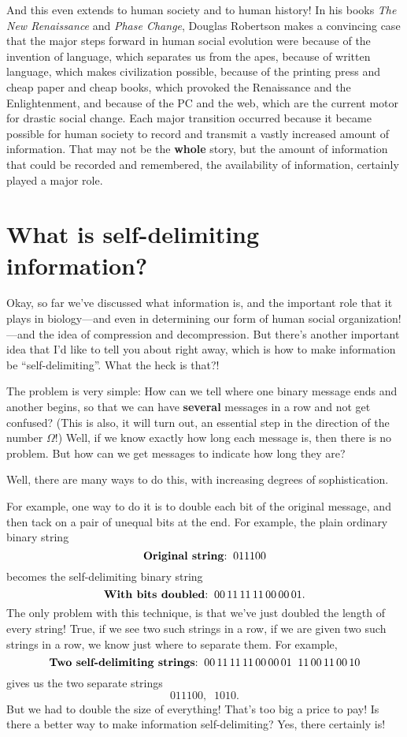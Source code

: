 \documentclass[12pt]{book}
\begin{document}
And this even extends to human society and to human history! 
In his books \emph{The New Renaissance} and \emph{Phase Change},
Douglas Robertson makes a convincing case that the major steps forward in human social evolution
were because of the invention of language, which separates us from the apes, 
because of written language, which makes
civilization possible, because of the printing press and cheap paper and cheap books, 
which provoked the Renaissance and
the Enlightenment, and because of the PC and the web, 
which are the current motor for drastic social change.
Each major transition occurred because it became possible for human society 
to record and transmit a vastly increased amount of information.
That may not be the \textbf{whole} story, but the amount of information that could be recorded and
remembered, the availability of information, certainly played a major role.

\section*{What is self-delimiting information?}

Okay, so far we've discussed what information is, and the important role that it plays in 
biology---and even in determining our form of human social organization!---and 
the idea of compression and decompression.  But there's another important idea that
I'd like to tell you about right away, which is how to make information be ``self-delimiting''.
What the heck is that?!
 
The problem is very simple: How can we tell where one binary message ends and another begins, 
so that we can have \textbf{several} messages in a row and not get confused?  
(This is also, it will turn out, an essential step
in the direction of the number $\Omega$!)
Well, if we know exactly how long each message is, then there is no problem.  But how
can we get messages to indicate how long they are?  
 
Well, there are many ways to do this, with increasing degrees of sophistication.
 
For example,
one way to do it is to double each bit of the original message, and then tack on a pair of unequal
bits at the end.
For example, the plain ordinary binary string
\[
   \mbox{\textbf{Original string}:} \;\; 011100
\] 
becomes the self-delimiting binary string
\[
   \mbox{\textbf{With bits doubled}:} \;\; 00\, 11 \, 11\, 11\, 00\, 00\, 01.
\]
The only problem with this technique, is that we've just doubled the length of every string! 
True, if we
see two such strings in a row, if we are given two such strings in a row,
we know just where to separate them.
For example,
\[
   \mbox{\textbf{Two self-delimiting strings}:} \;\; 00\, 11\, 11\, 11\, 00\, 00\, 01 \;\; 11\, 00\, 11\, 00\, 10
\]
gives us the two separate strings
\[
    011100, \;\; 1010.
\]
But we had to double the size of everything!  
That's too big a price to pay!
Is there a better way to make information self-delimiting?
Yes, there certainly is!
 
\end{document}
